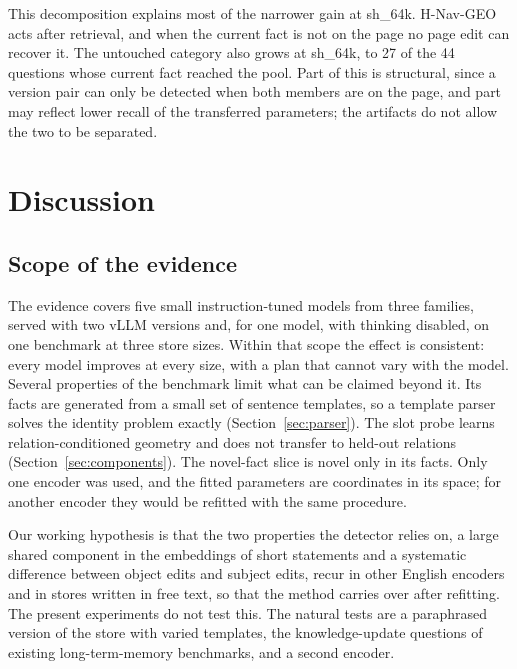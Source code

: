 \documentclass[11pt]{article}
\newcommand{\sub}[1]{\textsf{sh\_#1}}                    %
\newcommand{\geo}{H-Nav-GEO}
\begin{document}
This decomposition explains most of the narrower gain at \sub{64k}. \geo{} acts after retrieval, and when the current fact is not on the page no page edit can recover it. The untouched category also grows at \sub{64k}, to 27 of the 44 questions whose current fact reached the pool. Part of this is structural, since a version pair can only be detected when both members are on the page, and part may reflect lower recall of the transferred parameters; the artifacts do not allow the two to be separated.

\section{Discussion}
\label{sec:discussion}

\subsection{Scope of the evidence}
\label{sec:scope}

The evidence covers five small instruction-tuned models from three families, served with two vLLM versions and, for one model, with thinking disabled, on one benchmark at three store sizes. Within that scope the effect is consistent: every model improves at every size, with a plan that cannot vary with the model. Several properties of the benchmark limit what can be claimed beyond it. Its facts are generated from a small set of sentence templates, so a template parser solves the identity problem exactly (Section~\ref{sec:parser}). The slot probe learns relation-conditioned geometry and does not transfer to held-out relations (Section~\ref{sec:components}). The novel-fact slice is novel only in its facts. Only one encoder was used, and the fitted parameters are coordinates in its space; for another encoder they would be refitted with the same procedure.

Our working hypothesis is that the two properties the detector relies on, a large shared component in the embeddings of short statements and a systematic difference between object edits and subject edits, recur in other English encoders and in stores written in free text, so that the method carries over after refitting. The present experiments do not test this. The natural tests are a paraphrased version of the store with varied templates, the knowledge-update questions of existing long-term-memory benchmarks, and a second encoder. %
\end{document}
